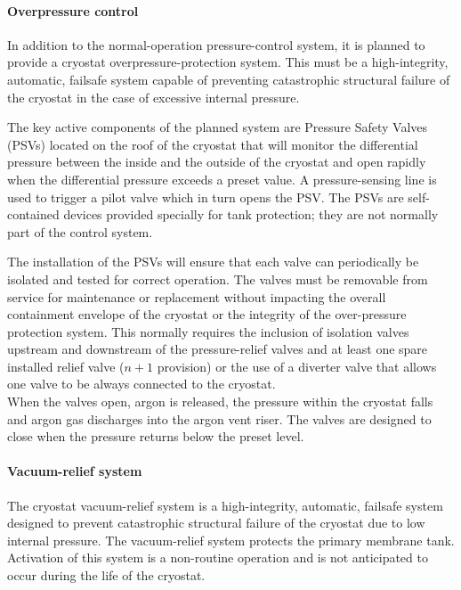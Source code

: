 \paragraph{Overpressure control}

In addition to the normal-operation pressure-control system, it is planned to provide a cryostat overpressure-protection system. This must be a high-integrity, automatic, failsafe system capable of preventing catastrophic structural failure of the cryostat in the case of excessive internal pressure.

The key active components of the planned system are Pressure Safety Valves (PSVs) located on the roof of the cryostat that will monitor the differential pressure between the inside and the outside of the cryostat and open rapidly when the differential pressure exceeds a preset value. A pressure-sensing line is used to trigger a pilot valve which in turn opens the PSV. The PSVs are self-contained devices provided specially for tank protection; they are not normally part of the control system. 

The installation of the PSVs will ensure that each valve can periodically be isolated and tested for correct operation. The valves must be removable from service for maintenance or replacement without impacting the overall containment envelope of the cryostat or the integrity of the over-pressure protection system. This normally requires the inclusion of isolation valves upstream and downstream of the pressure-relief valves and at least one spare installed relief valve ($n + 1$ provision) or the use of a diverter valve that allows one valve to be always connected to the cryostat. \\
%
When the valves open, argon is released, the pressure within the cryostat falls and argon gas discharges into the argon vent riser. The valves are designed to close when the pressure returns below the preset level.

\paragraph{Vacuum-relief system}

The cryostat vacuum-relief system is a high-integrity, automatic, failsafe system designed to prevent catastrophic structural failure of the cryostat due to low internal pressure. The vacuum-relief system protects the primary membrane tank. Activation of this system is a non-routine operation and is not anticipated to occur during the life of the cryostat.

